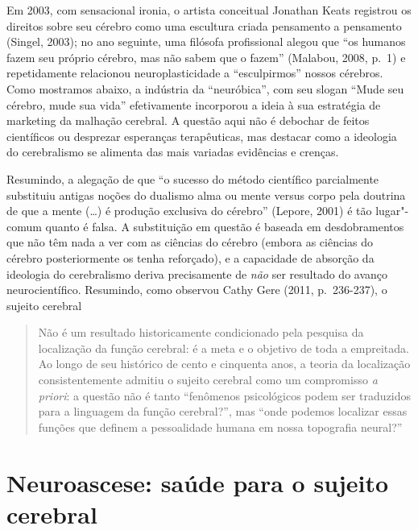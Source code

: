 Em 2003, com sensacional ironia, o artista conceitual Jonathan Keats
registrou os direitos sobre seu cérebro como uma escultura criada
pensamento a pensamento (Singel, 2003); no ano seguinte, uma filósofa
profissional alegou que ``os humanos fazem seu próprio cérebro, mas não
sabem que o fazem'' (Malabou, 2008, p.~1) e repetidamente relacionou
neuroplasticidade a ``esculpirmos'' nossos cérebros. Como mostramos
abaixo, a indústria da ``neuróbica'', com seu slogan ``Mude seu cérebro,
mude sua vida'' efetivamente incorporou a ideia à sua estratégia de
marketing da malhação cerebral. A questão aqui não é debochar de feitos
científicos ou desprezar esperanças terapêuticas, mas destacar como a
ideologia do cerebralismo se alimenta das mais variadas evidências e
crenças.

Resumindo, a alegação de que ``o sucesso do método científico
parcialmente substituiu antigas noções do dualismo alma ou mente versus
corpo pela doutrina de que a mente (\ldots{}) é produção exclusiva do
cérebro'' (Lepore, 2001) é tão lugar"-comum quanto é falsa. A
substituição em questão é baseada em desdobramentos que não têm nada a
ver com as ciências do cérebro (embora as ciências do cérebro
posteriormente os tenha reforçado), e a capacidade de absorção da
ideologia do cerebralismo deriva precisamente de \emph{não} ser
resultado do avanço neurocientífico. Resumindo, como observou Cathy Gere
(2011, p.~236-237), o sujeito cerebral

\begin{quote}
Não é um resultado historicamente condicionado pela pesquisa da
localização da função cerebral: é a meta e o objetivo de toda a
empreitada. Ao longo de seu histórico de cento e cinquenta anos, a
teoria da localização consistentemente admitiu o sujeito cerebral como
um compromisso \emph{a priori}: a questão não é tanto ``fenômenos
psicológicos podem ser traduzidos para a linguagem da função
cerebral?'', mas ``onde podemos localizar essas funções que definem a
pessoalidade humana em nossa topografia neural?''
\end{quote}

\section{Neuroascese: saúde para o sujeito cerebral}

